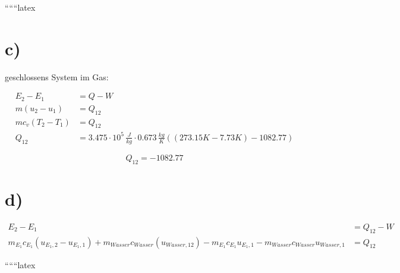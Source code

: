 ``````latex


\section*{c)}
geschlossens System im Gas:

\begin{align*}
E_2 - E_1 &= Q - W \\
m (u_2 - u_1) &= Q_{12} \\
m c_v (T_2 - T_1) &= Q_{12} \\
Q_{12} &= 3.475 \cdot 10^5 \, \frac{J}{kg} \cdot 0.673 \, \frac{kg}{K} \left( (273.15 K - 7.73 K) - 1082.77 \right)
\end{align*}

\[
\boxed{Q_{12} = -1082.77}
\]

\section*{d)}
\begin{align*}
E_2 - E_1 &= Q_{12} - W \\
m_{E_1} c_{E_1} (u_{E_1,2} - u_{E_1,1}) + m_{Wasser} c_{Wasser} (u_{Wasser,12}) - m_{E_1} c_{E_1} u_{E_1,1} - m_{Wasser} c_{Wasser} u_{Wasser,1} &= Q_{12}
\end{align*}

``````latex


